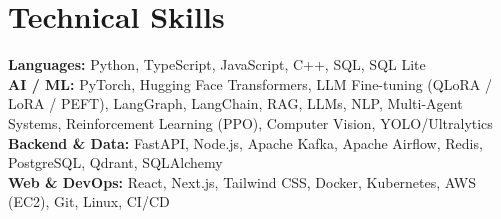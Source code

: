 \documentclass[letterpaper,10pt]{article}
\begin{document}
\section{Technical Skills}
 \begin{itemize}[leftmargin=0.15in, label={}]
    \small{\item{
     \textbf{Languages:} Python, TypeScript, JavaScript, C++, SQL, SQL Lite \\ \vspace{2pt}
     \textbf{AI / ML:} PyTorch, Hugging Face Transformers, LLM Fine-tuning (QLoRA / LoRA / PEFT), LangGraph, LangChain, RAG, LLMs, NLP, Multi-Agent Systems, Reinforcement Learning (PPO), Computer Vision, YOLO/Ultralytics \\ \vspace{2pt}
     \textbf{Backend \& Data:} FastAPI, Node.js, Apache Kafka, Apache Airflow, Redis, PostgreSQL, Qdrant, SQLAlchemy \\ \vspace{2pt}
     \textbf{Web \& DevOps:} React, Next.js, Tailwind CSS, Docker, Kubernetes, AWS (EC2), Git, Linux, CI/CD
    }}
 \end{itemize}
\end{document}
